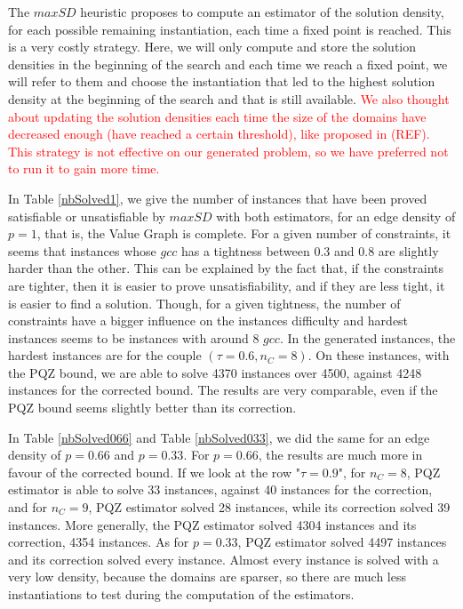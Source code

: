 \documentclass[jair,twoside,11pt,theapa]{article}
\newcommand{\major}[1]{\textcolor{red}{#1}}
\begin{document}
The $maxSD$ heuristic proposes to compute an estimator of the solution density, for each possible remaining instantiation, each time a fixed point is reached. This is a very costly strategy. Here, we will only compute and store the solution densities in the beginning of the search and each time we reach a fixed point, we will refer to them and choose the instantiation that led to the highest solution density at the beginning of the search and that is still available.  \major{We also thought about updating the solution densities each time the size of the domains have decreased enough (have reached a certain threshold), like proposed in (REF). This strategy is not effective on our generated problem, so we have preferred not to run it to gain more time.}





In Table \ref{nbSolved1}, we give the number of instances that have been proved satisfiable or unsatisfiable by $maxSD$ with both estimators, for an edge density of $p=1$, that is, the Value Graph is complete. For a given number of constraints, it seems that instances whose $gcc$ has a tightness between 0.3 and 0.8 are slightly harder than the other. This can be explained by the fact that, if the constraints are tighter, then it is easier to prove unsatisfiability, and if they are less tight, it is easier to find a solution. Though, for a given tightness, the number of constraints have a bigger influence on the instances difficulty and hardest instances seems to be instances with around 8 $gcc$. In the generated instances, the hardest instances are for the couple $(\tau = 0.6, n_C = 8)$. On these instances, with the PQZ bound, we are able to solve 4370 instances over 4500, against 4248 instances for the corrected bound. The results are very comparable, even if the PQZ bound seems slightly better than its correction.

In Table \ref{nbSolved066} and Table \ref{nbSolved033}, we did the same for an edge density of $p=0.66$ and $p=0.33$. For $p=0.66$, the results are much more in favour of the corrected bound. If we look at the row "$\tau=0.9$", for $n_C=8$, PQZ estimator is able to solve 33 instances, against 40 instances for the correction, and for $n_C=9$, PQZ estimator solved 28 instances, while its correction solved 39 instances. More generally, the PQZ estimator solved 4304 instances and its correction, 4354 instances. As for $p=0.33$, PQZ estimator solved 4497 instances and its correction solved every instance. Almost every instance is solved with a very low density, because the domains are sparser, so there are much less instantiations to test during the computation of the estimators.
\end{document}
